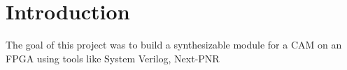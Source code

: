 \section{Introduction}
The goal of this project was to build a synthesizable module for a CAM on an FPGA using tools like System Verilog, Next-PNR